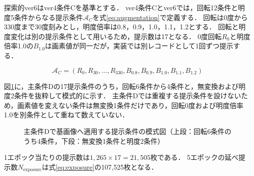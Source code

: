 \documentclass[uplatex,dvipdfmx]{jsarticle}
\begin{document}
探索的ver6はver4条件Cを基準とする．
ver4条件Cとver6では，回転12条件と明度5条件からなる提示条件$\mathcal{A}_C$を式\eqref{eq:augmentation}で定義する．
回転は0度から330度まで30度刻みとし，明度倍率は0.8，0.9，1.0，1.1，1.2とする．
回転と明度変化は別の提示条件として用いるため，提示数は17となる．
0度回転$R_0$と明度倍率1.0の$B_{1.0}$は画素値が同一だが，実装では別レコードとして1回ずつ提示する．

\begin{equation}
  \mathcal{A}_C
  =
  \left(
    R_{0},R_{30},\ldots,R_{330},
    B_{0.8},B_{0.9},B_{1.0},B_{1.1},B_{1.2}
  \right)
  \label{eq:augmentation}
\end{equation}

図\ref{fig:augmentation_examples}に，主条件Dの17提示条件のうち，回転6条件から4条件と，無変換および明度2条件を抜粋して模式的に示す．
主条件Dでは重複する提示条件を設けないため，画素値を変えない条件は無変換1条件だけであり，回転0度および明度倍率1.0を別条件として重ねて数えていない．

\begin{figure}[htbp]
  \centering
  \caption{主条件Dで基画像へ適用する提示条件の模式図（上段：回転6条件のうち4条件，下段：無変換1条件と明度2条件）}
  \label{fig:augmentation_examples}
\end{figure}

1エポック当たりの提示数は$1,265 \times 17 = 21,505$枚である．
5エポックの延べ提示数$N_{\mathrm{exposure}}$は式\eqref{eq:exposure}の107,525枚となる．
\end{document}
